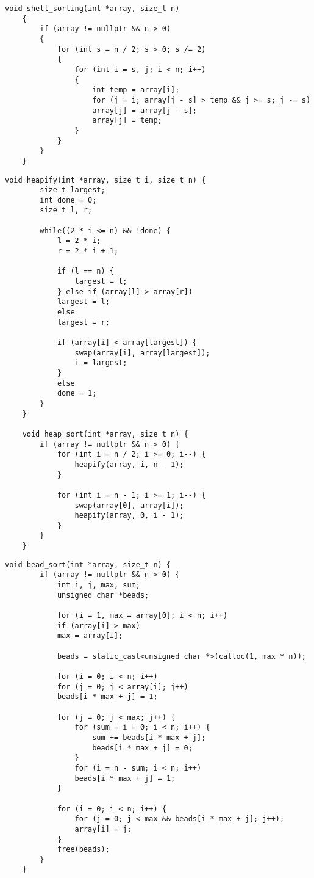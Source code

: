 \begin{lstlisting}[label=lst:shell,caption=Функция сортировки методом Шелла]
	void shell_sorting(int *array, size_t n)
	{
		if (array != nullptr && n > 0)
		{
			for (int s = n / 2; s > 0; s /= 2)
			{
				for (int i = s, j; i < n; i++)
				{
					int temp = array[i];
					for (j = i; array[j - s] > temp && j >= s; j -= s)
					array[j] = array[j - s];
					array[j] = temp;
				}
			}
		}
	}
\end{lstlisting}

\clearpage

\begin{lstlisting}[label=lst:heap,caption=Функция пирамидальной сортировки]
	void heapify(int *array, size_t i, size_t n) {
		size_t largest;
		int done = 0;
		size_t l, r;
		
		while((2 * i <= n) && !done) {
			l = 2 * i;
			r = 2 * i + 1;
			
			if (l == n) {
				largest = l;
			} else if (array[l] > array[r])
			largest = l;
			else
			largest = r;
			
			if (array[i] < array[largest]) {
				swap(array[i], array[largest]);
				i = largest;
			}
			else
			done = 1;
		}
	}
	
	void heap_sort(int *array, size_t n) {
		if (array != nullptr && n > 0) {
			for (int i = n / 2; i >= 0; i--) {
				heapify(array, i, n - 1);
			}
			
			for (int i = n - 1; i >= 1; i--) {
				swap(array[0], array[i]);
				heapify(array, 0, i - 1);
			}
		}
	}
\end{lstlisting}

\clearpage

\begin{lstlisting}[label=lst:bead,caption=Функция сортировки бусинами]
	void bead_sort(int *array, size_t n) {
		if (array != nullptr && n > 0) {
			int i, j, max, sum;
			unsigned char *beads;
			
			for (i = 1, max = array[0]; i < n; i++)
			if (array[i] > max)
			max = array[i];
			
			beads = static_cast<unsigned char *>(calloc(1, max * n));
			
			for (i = 0; i < n; i++)
			for (j = 0; j < array[i]; j++)
			beads[i * max + j] = 1;
			
			for (j = 0; j < max; j++) {
				for (sum = i = 0; i < n; i++) {
					sum += beads[i * max + j];
					beads[i * max + j] = 0;
				}
				for (i = n - sum; i < n; i++)
				beads[i * max + j] = 1;
			}
			
			for (i = 0; i < n; i++) {
				for (j = 0; j < max && beads[i * max + j]; j++);
				array[i] = j;
			}
			free(beads);
		}
	}
\end{lstlisting}

